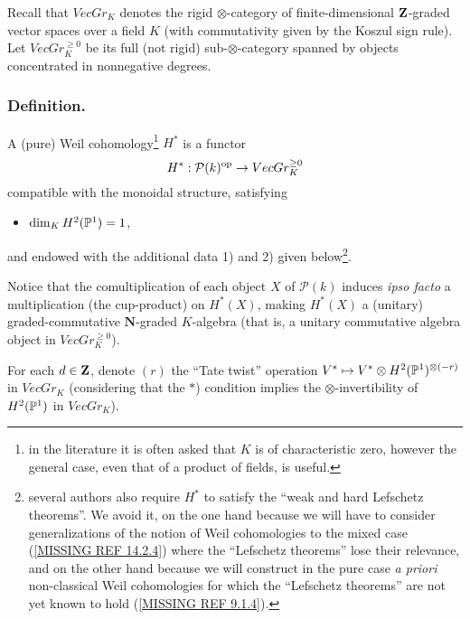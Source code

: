 \documentclass[../main.tex]{subfiles}
\begin{document}
Recall that $VecGr_K$ denotes the rigid $\otimes$-category of finite-dimensional $\Z$-graded vector spaces over a field $K$ (with commutativity given by the Koszul sign rule).
Let $VecGr_K^{\geq 0}$ be its full (not rigid) sub-$\otimes$-category spanned by objects concentrated in nonnegative degrees.

\subsubsection{Definition.} A (pure) Weil cohomology\footnote{in the literature it is often asked that $K$ is of characteristic zero, however the general case, even that of a product of fields, is useful.} $H^*$ is a functor
$$H^* : \mathcal{P}(k)^{\op} \to VecGr_K^{\geq 0}$$
compatible with the monoidal structure, satisfying
\begin{itemize}[label=\ast)]
    \item $\dim_K H^2(\P^1) = 1$,
\end{itemize}
and endowed with the additional data 1) and 2) given below\footnote{several authors also require $H^*$ to satisfy the \enquote{weak and hard Lefschetz theorems}. We avoid it, on the one hand because we will have to consider generalizations of the notion of Weil cohomologies to the mixed case (\ref{MISSING REF 14.2.4}) where the \enquote{Lefschetz theorems} lose their relevance, and on the other hand because we will construct in the pure case \emph{a priori} non-classical Weil cohomologies for which the \enquote{Lefschetz theorems} are not yet known to hold (\ref{MISSING REF 9.1.4}).}.

Notice that the comultiplication of each object $X$ of $\mathcal{P}(k)$ induces \emph{ipso facto} a multiplication (the cup-product) on $H^*(X)$, making $H^*(X)$ a (unitary) graded-commutative $\mathbf{N}$-graded $K$-algebra (that is, a unitary commutative algebra object in $VecGr_K^{\geq 0}$).

For each $d \in \Z$, denote $(r)$ the \enquote{Tate twist} operation $V^* \mapsto V^* \otimes H^2(\P^1)^{\otimes (-r)}$ in $VecGr_K$ (considering that the $\ast$) condition implies the $\otimes$-invertibility of $H^2(\P^1)$ in $VecGr_K$).
\end{document}
